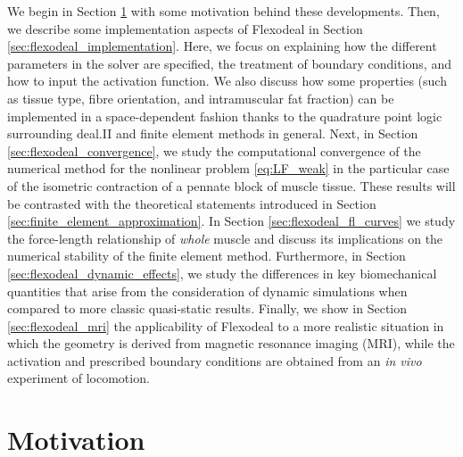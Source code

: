 \documentclass{sfuthesis}
\numberwithin{equation}{section}
\numberwithin{figure}{chapter}
\numberwithin{table}{chapter}
\theoremstyle{definition}
\begin{document}
We begin in Section \ref{sec:flexodeal_background} with some motivation behind these developments. Then, we describe some implementation aspects of Flexodeal in Section \ref{sec:flexodeal_implementation}. Here, we focus on explaining how the different parameters in the solver are specified, the treatment of boundary conditions, and how to input the activation function. We also discuss how some properties (such as tissue type, fibre orientation, and intramuscular fat fraction) can be implemented in a space-dependent fashion thanks to the quadrature point logic surrounding deal.II and finite element methods in general.
Next, in Section \ref{sec:flexodeal_convergence}, we study the computational convergence of the numerical method for the nonlinear problem \eqref{eq:LF_weak} in the particular case of the isometric contraction of a pennate block of muscle tissue. These results will be contrasted with the theoretical statements introduced in Section \ref{sec:finite_element_approximation}.
In Section \ref{sec:flexodeal_fl_curves} we study the force-length relationship of \textit{whole} muscle and discuss its implications on the numerical stability of the finite element method. 
Furthermore, in Section \ref{sec:flexodeal_dynamic_effects}, we study the differences in key biomechanical quantities that arise from the consideration of dynamic simulations when compared to more classic quasi-static results. 
Finally, we show in Section \ref{sec:flexodeal_mri} the applicability of Flexodeal to a more realistic situation in which the geometry is derived from magnetic resonance imaging (MRI), while the activation and prescribed boundary conditions are obtained from an \textit{in vivo} experiment of locomotion.

\section{Motivation} \label{sec:flexodeal_background} 

\end{document}
